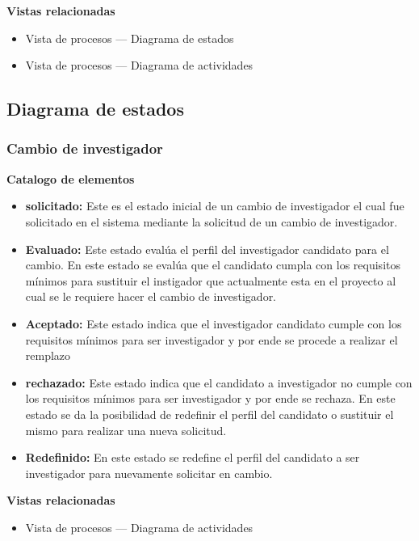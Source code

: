 \documentclass[12pt,oneside,letterpaper]{report}
\begin{document}
\textbf{Vistas relacionadas}
\begin{itemize}
 \item Vista de procesos --- Diagrama de estados
 \item Vista de procesos --- Diagrama de actividades
\end{itemize}


\subsection{Diagrama de estados}


\subsubsection{Cambio de investigador}


\textbf{Catalogo de elementos}

\begin{itemize}
 \item \textbf{solicitado:} Este es el estado inicial de un cambio de investigador el cual fue solicitado en el sistema mediante la solicitud de un cambio de investigador.
 \item \textbf{Evaluado:} Este estado evalúa el perfil del investigador candidato para el cambio. En este estado se evalúa que el candidato cumpla con los requisitos mínimos para sustituir el instigador que actualmente esta en el proyecto al cual se le requiere hacer el cambio de investigador.
 \item \textbf{Aceptado:} Este estado indica que el investigador candidato cumple con los requisitos mínimos para ser investigador y por ende se procede a realizar el remplazo
 \item \textbf{rechazado:} Este estado indica que el candidato a investigador no cumple con los requisitos mínimos para ser investigador y por ende se rechaza. En este estado se da la posibilidad de redefinir el perfil del candidato o sustituir el mismo para realizar una nueva solicitud.
 \item \textbf{Redefinido:} En este estado se redefine el perfil del candidato a ser investigador para nuevamente solicitar en cambio.
\end{itemize}



\textbf{Vistas relacionadas}
\begin{itemize}
 \item Vista de procesos --- Diagrama de actividades
\end{itemize}
\end{document}
